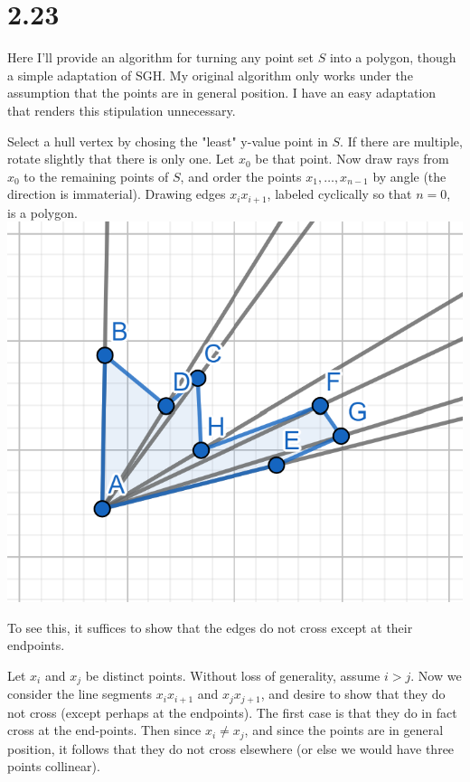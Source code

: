 \documentclass[12pt]{article}
\theoremstyle{definition}
\begin{document}
\section{2.23}

Here I'll provide an algorithm for turning any point set $S$ into a polygon, though a simple adaptation of SGH. My original algorithm only works under the assumption that the points are in general position. I have an easy adaptation that renders this stipulation unnecessary. 

 Select a hull vertex by chosing the "least" y-value point in $S$. If there are multiple, rotate slightly that there is only one. Let $x_0$ be that point. Now draw rays from $x_0$ to the remaining points of $S$, and order the points $x_1,\dots, x_{n-1}$ by angle (the direction is immaterial). Drawing edges $x_ix_{i+1}$, labeled cyclically so that $n = 0$, is a polygon.\\

\includegraphics[scale=1]{polygon_alg.png}

To see this, it suffices to show that the edges do not cross except at their endpoints. 

Let $x_i$ and $x_j$ be distinct points. Without loss of generality, assume $i> j$. Now we consider the line segments $x_ix_{i+1}$ and $x_jx_{j+1}$, and desire to show that they do not cross (except perhaps at the endpoints). The first case is that they do in fact cross at the end-points. Then since  $x_i \ne x_j$, and since the points are in general position, it follows that they do not cross elsewhere (or else we would have three points collinear).\\
\end{document}
